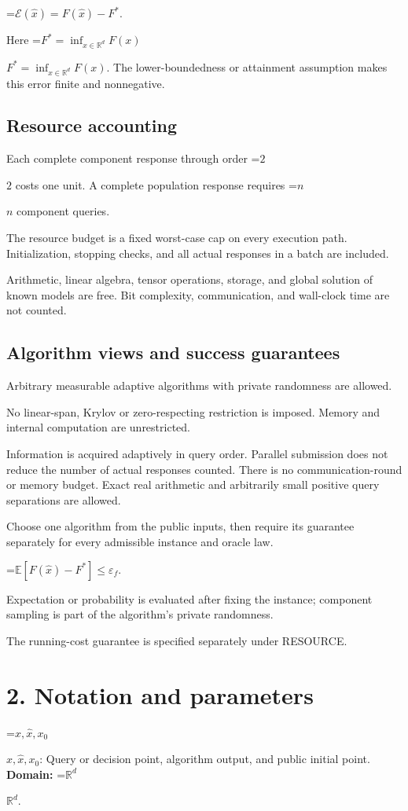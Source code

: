 \documentclass[10pt,a4paper]{article}
\newcommand{\AtlasMath}[1]{\par\begingroup\centering\setbox0=\hbox{$\displaystyle #1$}\ifdim\wd0>1.4\linewidth\typeout{ATLAS WIDE FORMULA: \the\wd0}\fi\ifdim\wd0>\linewidth\resizebox{\linewidth}{!}{\box0}\else\box0\fi\par\endgroup}
\newcommand{\AtlasInlineMath}[1]{\begingroup\setbox0=\hbox{$#1$}\ifdim\wd0>.4\linewidth\endgroup\AtlasMath{#1}\else\endgroup$#1$\fi}
\begin{document}
\AtlasMath{\mathcal{E}(\widehat{x})=F(\widehat{x})-F^*.}


Here \AtlasInlineMath{F^*=\inf_{x\in \mathbb{R}^d}F(x)}. The lower-boundedness or attainment assumption makes this error finite and nonnegative.

\subsection{Resource accounting}
Each complete component response through order \AtlasInlineMath{2} costs one unit. A complete population response requires \AtlasInlineMath{n} component queries.

The resource budget is a fixed worst-case cap on every execution path. Initialization, stopping checks, and all actual responses in a batch are included.

Arithmetic, linear algebra, tensor operations, storage, and global solution of known models are free. Bit complexity, communication, and wall-clock time are not counted.

\subsection{Algorithm views and success guarantees}
Arbitrary measurable adaptive algorithms with private randomness are allowed.

No linear-span, Krylov or zero-respecting restriction is imposed. Memory and internal computation are unrestricted.

Information is acquired adaptively in query order. Parallel submission does not reduce the number of actual responses counted. There is no communication-round or memory budget. Exact real arithmetic and arbitrarily small positive query separations are allowed.

Choose one algorithm from the public inputs, then require its guarantee separately for every admissible instance and oracle law.


\AtlasMath{\mathbb{E}\!\left[F(\widehat{x})-F^*\right]\le \varepsilon_f.}


Expectation or probability is evaluated after fixing the instance; component sampling is part of the algorithm's private randomness.

The running-cost guarantee is specified separately under RESOURCE.

\section{2. Notation and parameters}
\AtlasInlineMath{x,\widehat{x},x_0}: Query or decision point, algorithm output, and public initial point. \textbf{Domain:} \AtlasInlineMath{\mathbb{R}^d}.
\end{document}
